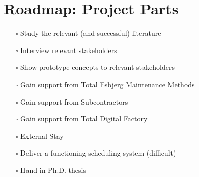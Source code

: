 \begin{minipage}[t]{0.46\textwidth}
\section*{Roadmap: Project Parts}
\begin{itemize}
	\item[\rlap{\raisebox{0.3ex}{\hspace{0.4ex}\tiny \ding{52}}}$\square$] Study the relevant (and successful) literature
	\item[\rlap{\raisebox{0.3ex}{\hspace{0.4ex}\tiny \ding{52}}}$\square$] Interview relevant stakeholders
	\item[\rlap{\raisebox{0.3ex}{\hspace{0.4ex}\tiny \ding{52}}}$\square$] Show prototype concepts to relevant stakeholders
	\item[\rlap{\raisebox{0.3ex}{\hspace{0.4ex}\tiny \ding{52}}}$\square$] Gain support from Total Esbjerg Maintenance Methods
	\item[\rlap{\raisebox{0.3ex}{\hspace{0.4ex}\tiny \ding{52}}}$\square$] Gain support from Subcontractors
	\item[\rlap{\raisebox{0.3ex}{\hspace{0.4ex}\tiny \ding{52}}}$\square$] Gain support from Total Digital Factory
	\item[$\square$] External Stay
	\item[$\square$] Deliver a functioning scheduling system (difficult)
	\item[$\square$] Hand in Ph.D. thesis
\end{itemize}

\end{minipage}
